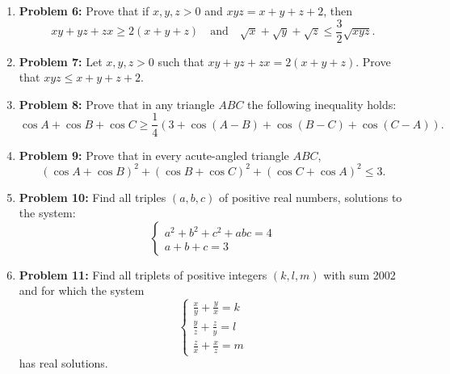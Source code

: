 \documentclass{article}
\begin{document}
\begin{enumerate}
    \vspace{3cm}
    
    \item \textbf{Problem 6:} Prove that if \( x, y, z > 0 \) and \( xyz = x + y + z + 2 \), then
    \[
    xy + yz + zx \geq 2(x + y + z) \quad \text{and} \quad \sqrt{x} + \sqrt{y} + \sqrt{z} \leq \frac{3}{2}\sqrt{xyz}.
    \]
    
    \vspace{3cm}
    
    \item \textbf{Problem 7:} Let \( x, y, z > 0 \) such that \( xy + yz + zx = 2(x + y + z) \). Prove that \( xyz \leq x + y + z + 2 \).
    
    \vspace{3cm}
    
    \item \textbf{Problem 8:} Prove that in any triangle \( ABC \) the following inequality holds:
    \[
    \cos A + \cos B + \cos C \geq \frac{1}{4} \left( 3 + \cos(A - B) + \cos(B - C) + \cos(C - A) \right).
    \]
    
    \vspace{3cm}
    
    \item \textbf{Problem 9:} Prove that in every acute-angled triangle \( ABC \),
    \[
    (\cos A + \cos B)^2 + (\cos B + \cos C)^2 + (\cos C + \cos A)^2 \leq 3.
    \]
    
    \vspace{3cm}
    
    \item \textbf{Problem 10:} Find all triples \( (a, b, c) \) of positive real numbers, solutions to the system:
    \[
    \begin{cases}
        a^2 + b^2 + c^2 + abc = 4 \\
        a + b + c = 3
    \end{cases}
    \]
    
    \vspace{3cm}
    
    \item \textbf{Problem 11:} Find all triplets of positive integers \( (k, l, m) \) with sum 2002 and for which the system
    \[
    \begin{cases}
        \frac{x}{y} + \frac{y}{x} = k \\
        \frac{y}{z} + \frac{z}{y} = l \\
        \frac{z}{x} + \frac{x}{z} = m
    \end{cases}
    \]
    has real solutions.
    

\end{enumerate}
\end{document}
